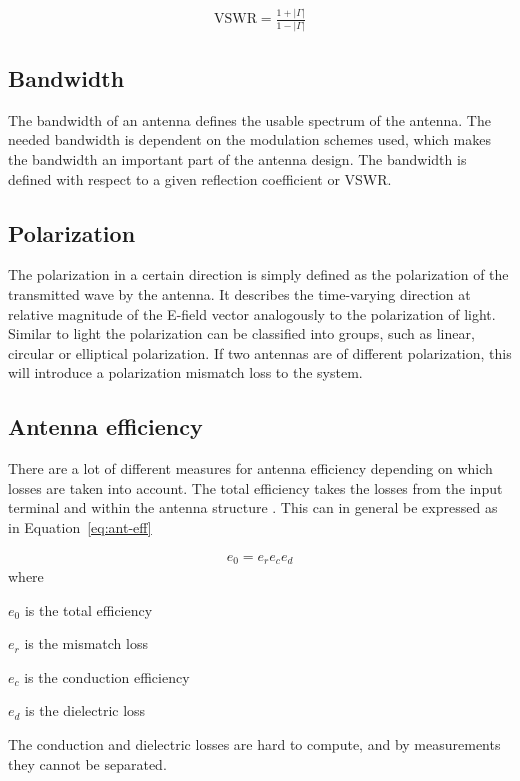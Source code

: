 \begin{align}
  \text{VSWR} = \frac{1+|\Gamma|}{1-|\Gamma|}
\end{align}

\subsection{Bandwidth}
The bandwidth of an antenna defines the usable spectrum of the antenna. The needed bandwidth is dependent on the modulation schemes used, which makes the bandwidth an important part of the antenna design. The bandwidth is defined with respect to a given reflection coefficient or VSWR. \cite{}

\subsection{Polarization}
The polarization in a certain direction is simply defined as the polarization of the transmitted wave by the antenna. It describes the time-varying direction at relative magnitude of the E-field vector analogously to the polarization of light. Similar to light the polarization can be classified into groups, such as linear, circular or elliptical polarization. If two antennas are of different polarization, this will introduce a polarization mismatch loss to the system. \cite{}

\subsection{Antenna efficiency}
There are a lot of different measures for antenna efficiency depending on which losses are taken into account. The total efficiency takes the losses from the input terminal and within the antenna structure \cite{}. This can in general be expressed as in Equation~\ref{eq:ant-eff} \cite{}

\begin{align}
\label{eq:ant-eff}
  e_0 = e_r e_c e_d 
\end{align}
where
\begin{where}
\item[$e_0$] is the total efficiency
\item[$e_r$] is the mismatch loss
\item[$e_c$] is the conduction efficiency  
\item[$e_d$] is the dielectric loss
\end{where}

The conduction and dielectric losses are hard to compute, and by measurements they cannot be separated. \cite{} 

